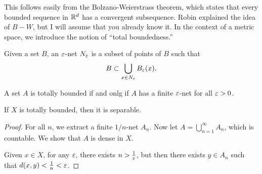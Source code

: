 \documentclass[10pt, twoside]{article}
\begin{document}
    This follows easily from the Bolzano-Weierstrass theorem, which states that every bounded sequence in $\mathbb{R}^d$ has a convergent subsequence. Robin explained the idea of $B-W$, but I will assume that you already know it. In the context of a metric space, we introduce the notion of ``total boundedness.''

    \begin{defn}[$\ep$-net]
        Given a set $B$, an $\ep$-net $N_{\varepsilon}$ is a subset of points of $B$ such that \[B \subset \bigcup_{x \in N_{\varepsilon}} B_{\varepsilon}(x).\]
    \end{defn}

    \begin{defn}
        A set $A$ is totally bounded if and onlg if $A$ has a finite $\ep$-net for all $\varepsilon > 0$.
    \end{defn}

    \begin{lem}
        If $X$ is totally bounded, then it is separable.
        \begin{proof}
            For all $n$, we extract a finite $1/n$-net $A_n$. Now let $A = \bigcup_{n=1}^{\infty} A_n$, which is countable. We show that $A$ is dense in $X$.

            Given $x \in X$, for any $\ep$, there exists $n > \frac{1}{\varepsilon}$, but then there exists $y \in A_n$ such that $d(x,y) < \frac{1}{n} < \varepsilon$.
        \end{proof}
    \end{lem}
\end{document}
